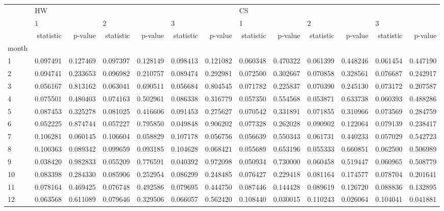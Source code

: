 \begin{tabular}{lrrrrrrrrrrrr}
\toprule
{} & \multicolumn{6}{l}{HW} & \multicolumn{6}{l}{CS} \\
{} & \multicolumn{2}{l}{1} & \multicolumn{2}{l}{2} & \multicolumn{2}{l}{3} & \multicolumn{2}{l}{1} & \multicolumn{2}{l}{2} & \multicolumn{2}{l}{3} \\
{} & statistic &   p-value & statistic &   p-value & statistic &   p-value & statistic &   p-value & statistic &   p-value & statistic &   p-value \\
month &           &           &           &           &           &           &           &           &           &           &           &           \\
\midrule
1     &  0.097491 &  0.127469 &  0.097397 &  0.128149 &  0.098413 &  0.121082 &  0.060348 &  0.470322 &  0.061399 &  0.448246 &  0.061454 &  0.447190 \\
2     &  0.094741 &  0.233653 &  0.096982 &  0.210757 &  0.089474 &  0.292981 &  0.072500 &  0.302667 &  0.070858 &  0.328561 &  0.076687 &  0.242917 \\
3     &  0.056167 &  0.813162 &  0.063041 &  0.690511 &  0.056684 &  0.804545 &  0.071782 &  0.225837 &  0.070390 &  0.245130 &  0.073172 &  0.207587 \\
4     &  0.075501 &  0.480403 &  0.074163 &  0.502961 &  0.086338 &  0.316779 &  0.057350 &  0.554568 &  0.053871 &  0.633738 &  0.060393 &  0.488286 \\
5     &  0.087453 &  0.325278 &  0.081025 &  0.416606 &  0.091453 &  0.275627 &  0.070542 &  0.331891 &  0.071855 &  0.310966 &  0.073569 &  0.284759 \\
6     &  0.052225 &  0.874744 &  0.057227 &  0.795850 &  0.049848 &  0.906202 &  0.077328 &  0.262028 &  0.090902 &  0.122064 &  0.079139 &  0.238417 \\
7     &  0.106281 &  0.060145 &  0.106604 &  0.058829 &  0.107178 &  0.056756 &  0.056639 &  0.550343 &  0.061731 &  0.440233 &  0.057029 &  0.542723 \\
8     &  0.100363 &  0.089342 &  0.099659 &  0.093185 &  0.104628 &  0.068421 &  0.055689 &  0.653196 &  0.055333 &  0.660851 &  0.062500 &  0.506989 \\
9     &  0.038420 &  0.982833 &  0.055209 &  0.776591 &  0.040392 &  0.972098 &  0.050934 &  0.730000 &  0.060458 &  0.519447 &  0.060965 &  0.508779 \\
10    &  0.083398 &  0.284330 &  0.085906 &  0.252954 &  0.086299 &  0.248485 &  0.076427 &  0.229418 &  0.081164 &  0.174577 &  0.078704 &  0.201641 \\
11    &  0.078164 &  0.469425 &  0.076748 &  0.492586 &  0.079695 &  0.444750 &  0.087446 &  0.144428 &  0.089619 &  0.126720 &  0.088836 &  0.132895 \\
12    &  0.063568 &  0.611089 &  0.079646 &  0.329506 &  0.066057 &  0.562420 &  0.108440 &  0.030015 &  0.110243 &  0.026064 &  0.104041 &  0.041881 \\
\bottomrule
\end{tabular}
